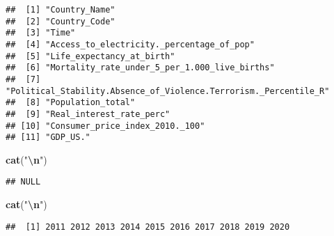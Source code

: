 \documentclass[
]{article}
\newenvironment{Shaded}{\begin{snugshade}}{\end{snugshade}}
\newcommand{\FunctionTok}[1]{\textcolor[rgb]{0.13,0.29,0.53}{\textbf{#1}}}
\newcommand{\NormalTok}[1]{#1}
\newcommand{\SpecialCharTok}[1]{\textcolor[rgb]{0.81,0.36,0.00}{\textbf{#1}}}
\newcommand{\StringTok}[1]{\textcolor[rgb]{0.31,0.60,0.02}{#1}}
\begin{document}
\begin{verbatim}
##  [1] "Country_Name"                                                   
##  [2] "Country_Code"                                                   
##  [3] "Time"                                                           
##  [4] "Access_to_electricity._percentage_of_pop"                       
##  [5] "Life_expectancy_at_birth"                                       
##  [6] "Mortality_rate_under_5_per_1.000_live_births"                   
##  [7] "Political_Stability.Absence_of_Violence.Terrorism._Percentile_R"
##  [8] "Population_total"                                               
##  [9] "Real_interest_rate_perc"                                        
## [10] "Consumer_price_index_2010._100"                                 
## [11] "GDP_US."
\end{verbatim}

\begin{Shaded}
\begin{Highlighting}[]
\FunctionTok{cat}\NormalTok{(}\StringTok{"}\SpecialCharTok{\textbackslash{}n}\StringTok{"}\NormalTok{)}
\end{Highlighting}
\end{Shaded}

\begin{Shaded}
\end{Shaded}

\begin{verbatim}
## NULL
\end{verbatim}

\begin{Shaded}
\begin{Highlighting}[]
\FunctionTok{cat}\NormalTok{(}\StringTok{"}\SpecialCharTok{\textbackslash{}n}\StringTok{"}\NormalTok{)}
\end{Highlighting}
\end{Shaded}

\begin{Shaded}
\end{Shaded}

\begin{verbatim}
##  [1] 2011 2012 2013 2014 2015 2016 2017 2018 2019 2020
\end{verbatim}
\end{document}

